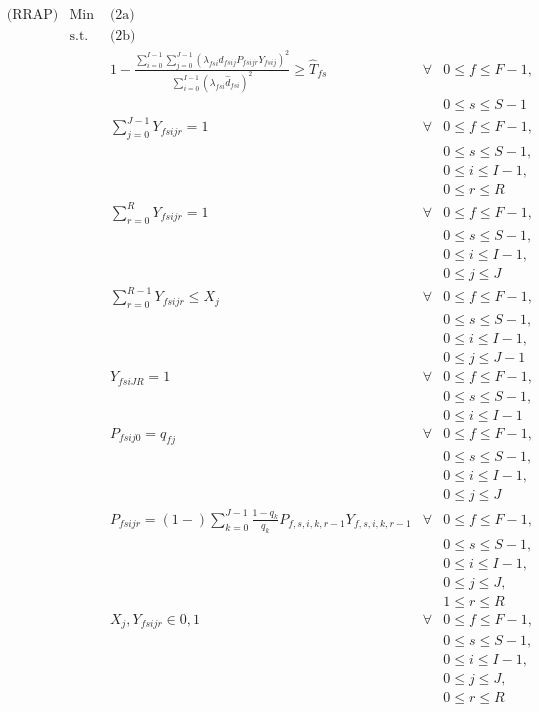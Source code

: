 \documentclass[11pt,]{article}
\begin{document}
\begin{align*}
& \text{(RRAP)} & \text{Min } & \text{(2a)}\\
%
& & \text{s.t. } & \text{(2b)}\\
%
& & & 1 - \frac{\sum_{i=0}^{I-1} \sum_{j=0}^{J-1} \left( \lambda_{fsi} d_{fsij} P_{fsijr} Y_{fsij} \right)^2}{\sum_{i=0}^{I-1} \left( \lambda_{fsi} \hat{d}_{fsi} \right)^2 } \geq \hat{T}_{fs}  & \forall & 0 \leq f \leq F-1, \tag{5a}\\
& & & & & 0 \leq s \leq S-1\\
%
& & & \sum_{j=0}^{J-1} Y_{fsijr} = 1 & \forall & 0 \leq f \leq F-1, \tag{5b}\\
& & & & & 0 \leq s \leq S-1,\\
& & & & & 0 \leq i \leq I-1,\\
& & & & & 0 \leq r \leq R\\
%
& & & \sum_{r=0}^{R} Y_{fsijr} = 1 & \forall & 0 \leq f \leq F-1, \tag{5c}\\
& & & & & 0 \leq s \leq S-1,\\
& & & & & 0 \leq i \leq I-1,\\
& & & & & 0 \leq j \leq J\\
%
& & & \sum_{r=0}^{R-1} Y_{fsijr} \leq X_j & \forall & 0 \leq f \leq F-1, \tag{5d}\\
& & & & & 0 \leq s \leq S-1,\\
& & & & & 0 \leq i \leq I-1,\\
& & & & & 0 \leq j \leq J-1\\
%
& & & Y_{fsiJR} = 1 & \forall & 0 \leq f \leq F-1, \tag{5e}\\
& & & & & 0 \leq s \leq S-1,\\
& & & & & 0 \leq i \leq I-1\\
%
& & & P_{fsij0} = q_{fj} & \forall & 0 \leq f \leq F-1, \tag{5f}\\
& & & & & 0 \leq s \leq S-1,\\
& & & & & 0 \leq i \leq I-1,\\
& & & & & 0 \leq j \leq J\\
%
& & & P_{fsijr} = \left(1 - \right) \sum_{k=0}^{J-1} \frac{1 - q_k}{q_k} P_{f,s,i,k,r-1} Y_{f,s,i,k,r-1}  & \forall & 0 \leq f \leq F-1, \tag{5g}\\
& & & & & 0 \leq s \leq S-1,\\
& & & & & 0 \leq i \leq I-1,\\
& & & & & 0 \leq j \leq J,\\
& & & & & 1 \leq r \leq R\\
%
& & & X_j, Y_{fsijr} \in {0,1} & \forall & 0 \leq f \leq F-1, \tag{5h}\\
& & & & & 0 \leq s \leq S-1,\\
& & & & & 0 \leq i \leq I-1,\\
& & & & & 0 \leq j \leq J,\\
& & & & & 0 \leq r \leq R\\
\end{align*}
\end{document}

